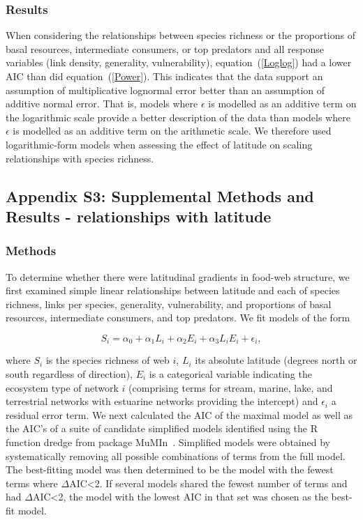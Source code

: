 \documentclass[12pt]{article}
\begin{document}
\begin{landscape}
  \subsubsection*{Results}

    When considering the relationships between species richness or the proportions 
    of basal resources, intermediate consumers, or top predators and all response variables 
    (link density, generality, vulnerability), equation~(\ref{Loglog}) had a
    lower AIC than did equation~(\ref{Power}). This indicates that the
    data support an assumption of multiplicative lognormal error better than an
    assumption of additive normal error. That is, models where $\epsilon$ is
    modelled as an additive term on
    the logarithmic scale provide a better description of the data than models
    where $\epsilon$ is modelled as an additive term on the arithmetic scale.  
    We therefore used logarithmic-form models when assessing the
    effect of latitude on scaling relationships  with species richness.

\subsection*{Appendix S3: Supplemental Methods and Results - relationships with latitude}

  \subsubsection*{Methods}

    To determine whether there were latitudinal gradients in food-web structure,
    we first examined simple linear relationships between latitude and each of 
    species richness, links per species, generality, vulnerability, and proportions
    of basal resources, intermediate consumers, and top predators. We fit models of the form

    \begin{equation}
    \label{Latfull}
    S_{i} = \alpha_{0} + \alpha_{1} L_{i} + \alpha_{2} E_{i} + \alpha_{3} L_{i} E_{i} + \epsilon_{i} ,
    \end{equation}

    \noindent where $S_{i}$ is the species richness of web $i$, $L_{i}$ its absolute
    latitude (degrees north or south  regardless of direction), $E_{i}$ is a categorical
    variable indicating the ecosystem type of network $i$ (comprising terms for stream, 
    marine, lake, and terrestrial networks with estuarine
    networks providing the intercept) and $\epsilon_{i}$ a residual error term. 
    We next calculated the AIC
    of the maximal model as well as the AIC's of a suite of candidate simplified models identified
    using the R~\citep{R} function dredge from package MuMIn~\citep{MuMIn}. 
    Simplified models were obtained by
    systematically removing all possible combinations of terms from the full model.
    The best-fitting model was then determined to be the model with the fewest terms 
    where $\Delta$AIC\textless2. If several models shared the fewest number of terms 
    and had $\Delta$AIC\textless2, the model with the lowest AIC in that set was chosen as the best-fit
    model.



\end{landscape}
\end{document}
